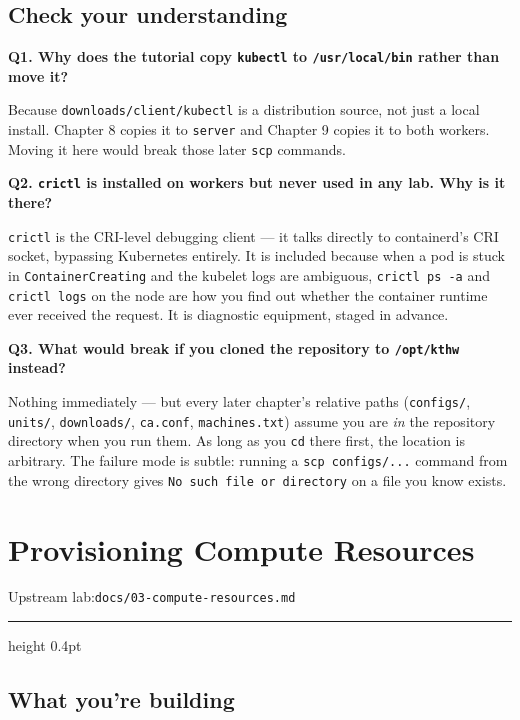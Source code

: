 \documentclass[11pt,oneside]{report}
\newcommand{\upstreamlab}[1]{%
  {\sffamily\footnotesize\color{steel}Upstream lab:\quad\texttt{#1}}\par\vspace{2pt}%
  {\color{rule}\hrule height 0.4pt}\vspace{8pt}}
\begin{document}
\hypertarget{check-your-understanding-2}{%
\section{Check your
understanding}\label{check-your-understanding-2}}

\textbf{Q1. Why does
the tutorial copy
\texttt{kubectl} to
\texttt{/usr/local/bin}
rather than move
it?}

Because
\texttt{downloads/}\allowbreak{}\texttt{client/}\allowbreak{}\texttt{kubectl}
is a distribution
source, not just a
local install.
Chapter 8 copies it
to \texttt{server}
and Chapter 9 copies
it to both workers.
Moving it here would
break those later
\texttt{scp}
commands.

\textbf{Q2.
\texttt{crictl} is
installed on workers
but never used in
any lab. Why is it
there?}

\texttt{crictl} is
the CRI-level
debugging client ---
it talks directly to
containerd's CRI
socket, bypassing
Kubernetes entirely.
It is included
because when a pod
is stuck in
\texttt{ContainerCreating}
and the kubelet logs
are ambiguous,
\texttt{crictl\ ps\ -a}
and
\texttt{crictl\ logs}
on the node are how
you find out whether
the container
runtime ever
received the
request. It is
diagnostic
equipment, staged in
advance.

\textbf{Q3. What
would break if you
cloned the
repository to
\texttt{/opt/kthw}
instead?}

Nothing immediately
--- but every later
chapter's relative
paths
(\texttt{configs/},
\texttt{units/},
\texttt{downloads/},
\texttt{ca.conf},
\texttt{machines.txt})
assume you are
\emph{in} the
repository directory
when you run them.
As long as you
\texttt{cd} there
first, the location
is arbitrary. The
failure mode is
subtle: running a
\texttt{scp\ configs/...}
command from the
wrong directory
gives
\texttt{No\ such\ file\ or\ directory}
on a file you know
exists.

\hypertarget{chap-3}{%
\chapter{Provisioning
Compute
Resources}\label{chap-3}}

\upstreamlab{docs/03-compute-resources.md}

\hypertarget{what-youre-building-3}{%
\section{What you're
building}\label{what-youre-building-3}}
\end{document}
